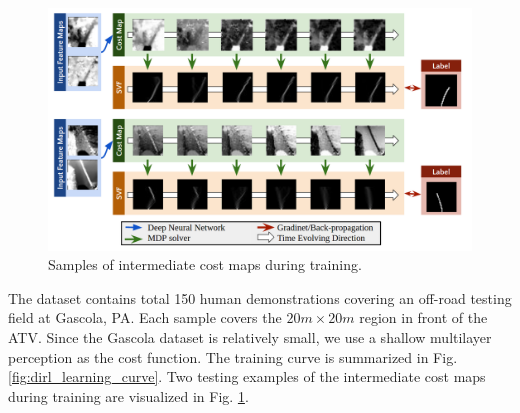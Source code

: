 \documentclass[../thesis.tex]{subfiles}
\begin{document}
\begin{figure}[t]
	\begin{center}
		\centerline{\includegraphics[width=0.8\columnwidth]{./DIRL/fig/inter_cost_map.png}}
		\caption{Samples of intermediate cost maps during training.}
		\label{fig:inter_cost_map}
	\end{center}
\end{figure} 


The dataset contains total 150 human demonstrations covering an off-road testing field at Gascola, PA. Each sample covers the $20m \times 20m$ region in front of the ATV. Since the Gascola dataset is relatively small, we use a shallow multilayer perception as the cost function. 
The training curve is summarized in Fig. \ref{fig:dirl_learning_curve}. 
Two testing examples of the intermediate cost maps during training are visualized in Fig. \ref{fig:inter_cost_map}. 


\end{document}
